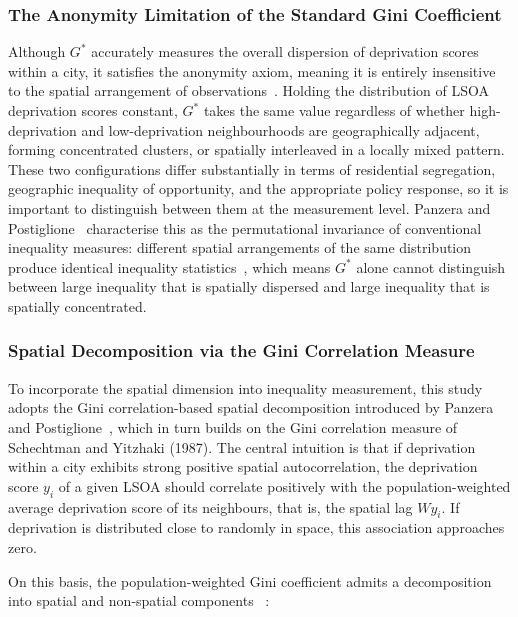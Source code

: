 \documentclass[11pt,journal,compsoc]{IEEEtran}
\begin{document}
\subsubsection{The Anonymity Limitation of the Standard Gini Coefficient}

Although $G^*$ accurately measures the overall dispersion of deprivation scores within a city, it satisfies the anonymity axiom, meaning it is entirely insensitive to the spatial arrangement of observations~\cite{bickenbach2008disproportionality}. Holding the distribution of LSOA deprivation scores constant, $G^*$ takes the same value regardless of whether high-deprivation and low-deprivation neighbourhoods are geographically adjacent, forming concentrated clusters, or spatially interleaved in a locally mixed pattern. These two configurations differ substantially in terms of residential segregation, geographic inequality of opportunity, and the appropriate policy response, so it is important to distinguish between them at the measurement level. Panzera and Postiglione~\cite{panzera2020measuring} characterise this as the permutational invariance of conventional inequality measures: different spatial arrangements of the same distribution produce identical inequality statistics~\cite{rey2005regional}, which means $G^*$ alone cannot distinguish between large inequality that is spatially dispersed and large inequality that is spatially concentrated.

\subsubsection{Spatial Decomposition via the Gini Correlation Measure}

To incorporate the spatial dimension into inequality measurement, this study adopts the Gini correlation-based spatial decomposition introduced by Panzera and Postiglione~\cite{panzera2020measuring}, which in turn builds on the Gini correlation measure of Schechtman and Yitzhaki (1987). The central intuition is that if deprivation within a city exhibits strong positive spatial autocorrelation, the deprivation score $y_i$ of a given LSOA should correlate positively with the population-weighted average deprivation score of its neighbours, that is, the spatial lag $Wy_i$. If deprivation is distributed close to randomly in space, this association approaches zero.

On this basis, the population-weighted Gini coefficient admits a decomposition into spatial and non-spatial components ~\cite[Eq.~14]{panzera2020measuring}:
\end{document}
